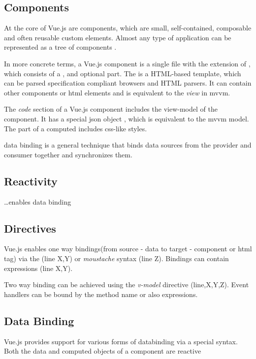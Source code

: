 \subsection{Components}
At the core of Vue.js are components, which are small, self-contained, composable and often reusable custom elements. Almost any type of application can be represented as a tree of components \parencite{vuejs_guide}. 

In more concrete terms, a Vue.js component is a single file with the extension of , which consists of a ,  and optional  part. The  is a HTML-based template, which can be parsed specification compliant browsers and HTML parsers. It can contain other components or html elements and is equivalent to the \textit{view} in \gls{mvvm}. 

The \textit{code} section of a Vue.js component includes the view-model of the component. It has a special json object , which is equivalent to the \gls{mvvm} model. %
The  part of a computed includes css-like styles.


data binding is a general technique that binds data sources from the provider and consumer together and synchronizes them.


\subsection{Reactivity}


\dots enables data binding
\subsection{Directives}
Vue.js enables one way bindings(from source - data to target - component or html tag) via the  (line X,Y) or \textit{moustache} syntax (line Z). 
Bindings can contain expressions (line X,Y). 

Two way binding can be achieved using the \textit{v-model} directive (line,X,Y,Z). 
Event handlers can be bound by the method name or also expressions.



\subsection{Data Binding}
Vue.js provides support for various forms of \gls{databinding} via a special syntax. Both the data and computed objects of a  component are reactive 


